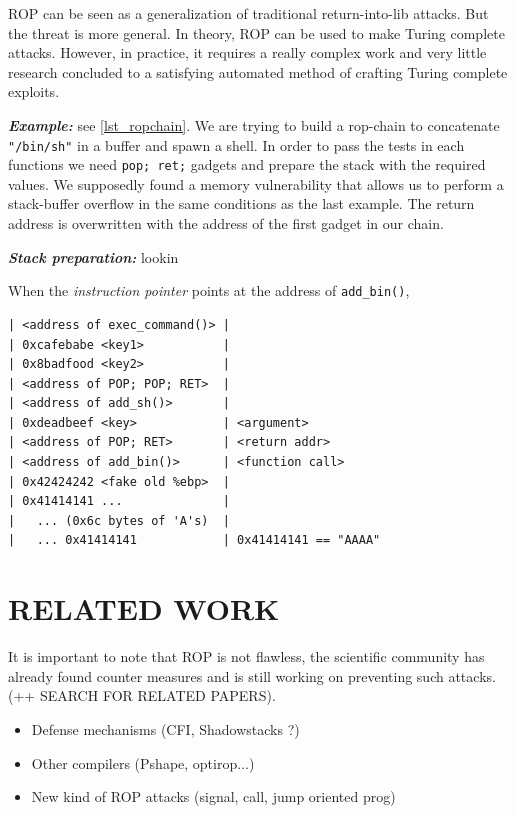 \documentclass[10pt,twocolumn]{article}
\begin{document}
ROP can be seen as a generalization of traditional return-into-lib attacks. But
the threat is more general. In theory, ROP can be used to make Turing complete
attacks. However, in practice, it requires a really complex work and very
little research concluded to a satisfying automated method of crafting Turing complete
exploits.

\textbf{\textit{Example:}} see \autoref{lst_ropchain}. We are trying to build a
rop-chain to concatenate \texttt{"/bin/sh"} in a buffer and spawn a shell. In
order to pass the tests in each functions we need \texttt{pop; ret;} gadgets
and prepare the stack with the required values. We supposedly found a memory
vulnerability that allows us to perform a stack-buffer overflow in the same
conditions as the last example. The return address is overwritten with the
address of the first gadget in our chain.



\textbf{\textit{Stack preparation:}} lookin




When the \textit{instruction pointer} points at the address of
\texttt{add\_bin()},

\begin{lstlisting}[float,aboveskip=\bigskipamount,belowskip=\medskipamount,caption=Stack
prepared with a ROP chain]
| <address of exec_command()> |
| 0xcafebabe <key1>           |
| 0x8badfood <key2>           |
| <address of POP; POP; RET>  |
| <address of add_sh()>       |
| 0xdeadbeef <key>            | <argument>
| <address of POP; RET>       | <return addr>
| <address of add_bin()>      | <function call>
| 0x42424242 <fake old %ebp>  |
| 0x41414141 ...              |
|   ... (0x6c bytes of 'A's)  |
|   ... 0x41414141            | 0x41414141 == "AAAA"
\end{lstlisting}


\section{RELATED WORK}
It is important to note that ROP is
not flawless, the scientific community has already found counter measures and
is still working on preventing such attacks. (++ SEARCH FOR RELATED PAPERS).
\begin{itemize}
    \item Defense mechanisms (CFI, Shadowstacks ?)
    \item Other compilers (Pshape, optirop...)
    \item New kind of ROP attacks (signal, call, jump oriented prog)
\end{itemize}
\end{document}
